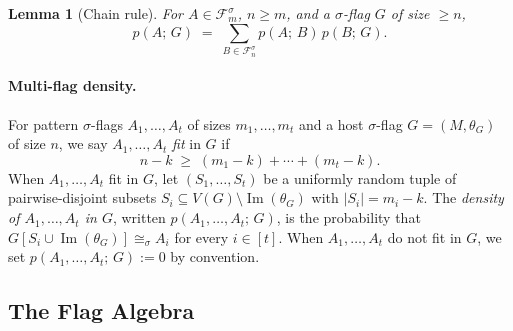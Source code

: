 \documentclass{article}
\newtheorem{lemma}[theorem]{Lemma}
\newcommand{\den}[2]{p(#1;\,#2)}
\begin{document}
\begin{lemma}[Chain rule]\label{lem:chain-rule}
  For $A \in \mathcal{F}^\sigma_m$, $n \geq m$, and a $\sigma$-flag $G$ of size
  $\geq n$,
  \[
    \den{A}{G}
    \;=\;
    \sum_{B \in \mathcal{F}^\sigma_n} \den{A}{B}\,\den{B}{G}.
  \]
\end{lemma}

\paragraph{Multi-flag density.}
For pattern $\sigma$-flags $A_1, \ldots, A_t$ of sizes $m_1, \ldots, m_t$ and
a host $\sigma$-flag $G = (M, \theta_G)$ of size $n$, we say $A_1, \ldots, A_t$
\emph{fit} in $G$ if
\[
  n - k \;\geq\; (m_1 - k) + \cdots + (m_t - k).
\]
When $A_1, \ldots, A_t$ fit in $G$, let $(S_1, \ldots, S_t)$ be a uniformly
random tuple of pairwise-disjoint subsets $S_i \subseteq V(G) \setminus
\operatorname{Im}(\theta_G)$ with $|S_i| = m_i - k$.
The \emph{density of $A_1, \ldots, A_t$ in $G$}, written $\den{A_1,\ldots,A_t}{G}$, is the
probability that $G[S_i \cup \operatorname{Im}(\theta_G)] \cong_\sigma A_i$
for every $i \in [t]$.
When $A_1, \ldots, A_t$ do not fit in $G$, we set
$\den{A_1,\ldots,A_t}{G} := 0$ by convention.

\subsection{The Flag Algebra}
\end{document}
